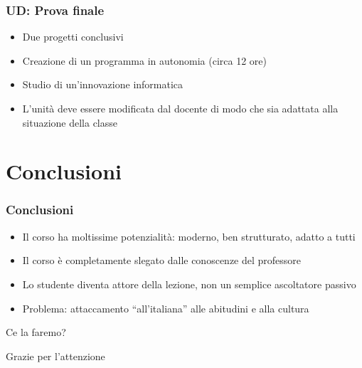 \documentclass[
    hyperref={colorlinks,citecolor=black,linkcolor=black,urlcolor=blue}
]{beamer}
\begin{document}
\begin{frame}
  \frametitle{UD: Prova finale}

  \begin{itemize}
    \item Due progetti conclusivi
    \item Creazione di un programma in autonomia (circa 12 ore)
    \item Studio di un'innovazione informatica
  \end{itemize}

  \begin{itemize}
    \item L'unità deve essere modificata dal docente di modo che sia adattata alla situazione della classe
  \end{itemize}
\end{frame}

\section{Conclusioni}

\begin{frame}
  \frametitle{Conclusioni}

  \begin{itemize}
    \item Il corso ha moltissime potenzialità: moderno, ben strutturato, adatto a tutti
    \item Il corso è completamente slegato dalle conoscenze del professore
    \item Lo studente diventa attore della lezione, non un semplice ascoltatore passivo
  \end{itemize}
  \begin{itemize}
    \item Problema: attaccamento ``all'italiana'' alle abitudini e alla cultura
  \end{itemize}

  \vspace{1em}

  \centerline{Ce la faremo?}
\end{frame}

\begin{frame}
  \Huge{\centerline{Grazie per l'attenzione}}
\end{frame}

\end{document}
